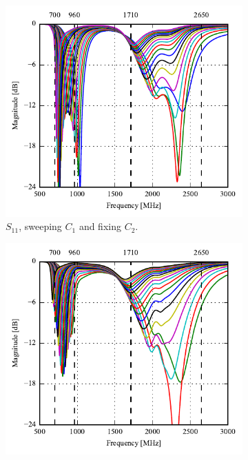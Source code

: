 \begin{figure}[htbp]
   \begin{subfigure}[b]{0.49\linewidth}
        \centering
        \includegraphics{img/tech_sol/monopole/5mm/6pf_s11}
        \caption{$S_{11}$, sweeping $C_1$ and fixing $C_2$.}
        \label{fig:ant1_6pf_s11}
    \end{subfigure}
    \hfill
    \begin{subfigure}[b]{0.49\linewidth}
        \centering
        \includegraphics{img/tech_sol/monopole/5mm/6pf_s22}

\end{subfigure}
\end{figure}

